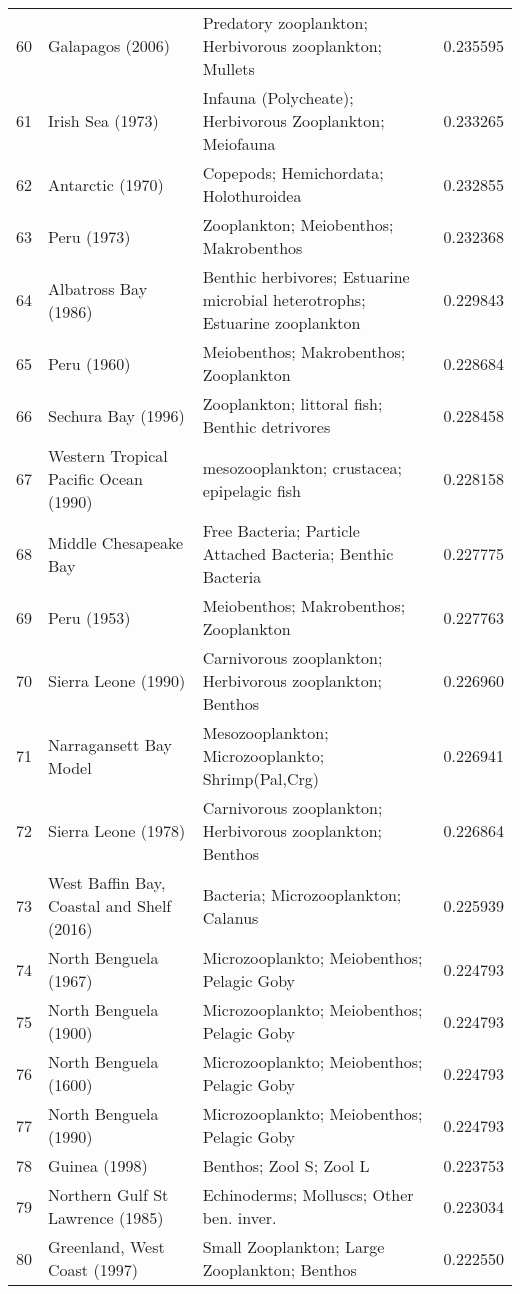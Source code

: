 \begin{tabular}{rllr}
60 & Galapagos (2006) & Predatory zooplankton; Herbivorous zooplankton; Mullets & 0.235595 \\
61 & Irish Sea (1973) & Infauna (Polycheate); Herbivorous Zooplankton; Meiofauna & 0.233265 \\
62 & Antarctic (1970) & Copepods; Hemichordata; Holothuroidea & 0.232855 \\
63 & Peru (1973) & Zooplankton; Meiobenthos; Makrobenthos & 0.232368 \\
64 & Albatross Bay (1986) & Benthic herbivores; Estuarine microbial heterotrophs; Estuarine zooplankton & 0.229843 \\
65 & Peru (1960) & Meiobenthos; Makrobenthos; Zooplankton & 0.228684 \\
66 & Sechura Bay (1996) & Zooplankton; littoral fish; Benthic detrivores & 0.228458 \\
67 & Western Tropical Pacific Ocean (1990) & mesozooplankton; crustacea; epipelagic fish & 0.228158 \\
68 & Middle Chesapeake Bay & Free Bacteria; Particle Attached Bacteria; Benthic Bacteria & 0.227775 \\
69 & Peru (1953) & Meiobenthos; Makrobenthos; Zooplankton & 0.227763 \\
70 & Sierra Leone (1990) & Carnivorous zooplankton; Herbivorous zooplankton; Benthos & 0.226960 \\
71 & Narragansett Bay Model & Mesozooplankton; Microzooplankto; Shrimp(Pal,Crg) & 0.226941 \\
72 & Sierra Leone (1978) & Carnivorous zooplankton; Herbivorous zooplankton; Benthos & 0.226864 \\
73 & West Baffin Bay, Coastal and Shelf (2016) & Bacteria; Microzooplankton; Calanus & 0.225939 \\
74 & North Benguela (1967) & Microzooplankto; Meiobenthos; Pelagic Goby & 0.224793 \\
75 & North Benguela (1900) & Microzooplankto; Meiobenthos; Pelagic Goby & 0.224793 \\
76 & North Benguela (1600) & Microzooplankto; Meiobenthos; Pelagic Goby & 0.224793 \\
77 & North Benguela (1990) & Microzooplankto; Meiobenthos; Pelagic Goby & 0.224793 \\
78 & Guinea (1998) & Benthos; Zool S; Zool L & 0.223753 \\
79 & Northern Gulf St Lawrence (1985) & Echinoderms; Molluscs; Other ben. inver. & 0.223034 \\
80 & Greenland, West Coast (1997) & Small Zooplankton; Large Zooplankton; Benthos & 0.222550 \\

\end{tabular}
